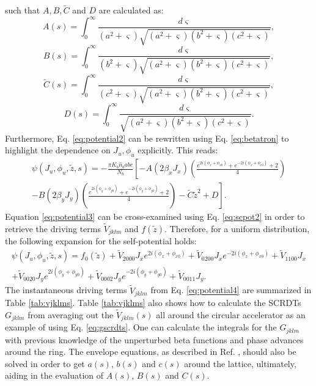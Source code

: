 such that $A,B,\tilde{C}$ and $D$ are calculated as:
\begin{equation}
    \label{eq:A}
    A(s)=\int_0^{\infty}{\frac{d \varsigma }{\left( a^2+ \varsigma \right) \sqrt{\left( a^2+ \varsigma \right) \left( b^2+ \varsigma \right) \left( c^2+ \varsigma \right)}}},
\end{equation}
\begin{equation}
    \label{eq:B}
    B(s)=\int_0^{\infty}{\frac{d \varsigma }{\left( b^2+ \varsigma \right) \sqrt{\left( a^2+ \varsigma \right)\left( b^2+ \varsigma \right)\left( c^2+ \varsigma \right)}}},
\end{equation}
\begin{equation}
    \label{eq:C}
    \tilde{C}(s)=\int_0^{\infty}{\frac{d \varsigma }{\left( c^2+ \varsigma \right) \sqrt{\left( a^2+ \varsigma \right) \left( b^2+ \varsigma \right) \left( c^2+ \varsigma \right)}}},
\end{equation}
\begin{equation}
    \label{eq:D}
    D(s)=\int_0^{\infty}{\frac{d \varsigma }{\sqrt{\left( a^2+ \varsigma \right) \left( b^2+ \varsigma \right) \left( c^2+ \varsigma \right)}}}.
\end{equation}
Furthermore, Eq. \ref{eq:potential2} can be rewritten using Eq. \ref{eq:betatron} to highlight the dependence on $J_u,\phi_u$ explicitly. This reads:
\begin{multline}
    \label{eq:potential3}
    \psi(J_u,\phi_u, \tilde{z},s)=-\frac{\pi K_b \hat{n}_b a b c }{N_b} \left[ -A \left( 2 \beta_x J_x \right) \left( \frac{e^{2i(\phi_x+\phi_{x0})}+e^{-2i(\phi_x+\phi_{x0})}+2}{4} \right) \right. \\
    \left. -B \left( 2 \beta_y J_y \right) \left( \frac{e^{2i(\phi_y+\phi_{y0})}+e^{-2i(\phi_y+\phi_{y0})}+2}{4}\right) - \tilde{C} \tilde{z}^2 +D  \right].
\end{multline}
Equation \ref{eq:potential3} can be cross-examined using Eq. \ref{eq:scpot2} in order to retrieve the driving terms $\tilde{V}_{jklm}$ and $f(\tilde{z})$. Therefore, for a uniform distribution, the following expansion for the self-potential holds:
\begin{multline}
    \label{eq:potential4}
    \psi(J_u,\phi_u, \tilde{z},s) = f_0(\tilde{z})+\tilde{V}_{2000}J_x e^{2i(\phi_x+\phi_{x0})}+\tilde{V}_{0200}J_x e^{-2i(\phi_x+\phi_{x0})}+\tilde{V}_{1100}J_x\\+\tilde{V}_{0020}J_y e^{2i(\phi_y+\phi_{y0})}+\tilde{V}_{0002}J_y e^{-2i(\phi_y+\phi_{y0})}+\tilde{V}_{0011}J_y.
\end{multline}
The instantaneous driving terms $\tilde{V}_{jklm}$ from Eq. \ref{eq:potential4} are summarized in Table \ref{tab:vjklms}. Table \ref{tab:vjklms} also shows how to calculate the SCRDTs $G_{jklm}$ from averaging out the $\tilde{V}_{jklm}(s)$ all around the circular accelerator as an example of using Eq. \ref{eq:gscrdts}. One can calculate the integrals for the $G_{jklm}$ with previous knowledge of the unperturbed beta functions and phase advances around the ring. The envelope equations, as described in Ref. \cite{witchcraft}, should also be solved in order to get $a(s)$, $b(s)$ and $c(s)$ around the lattice, ultimately, aiding in the evaluation of $A(s)$, $B(s)$ and $C(s)$.

